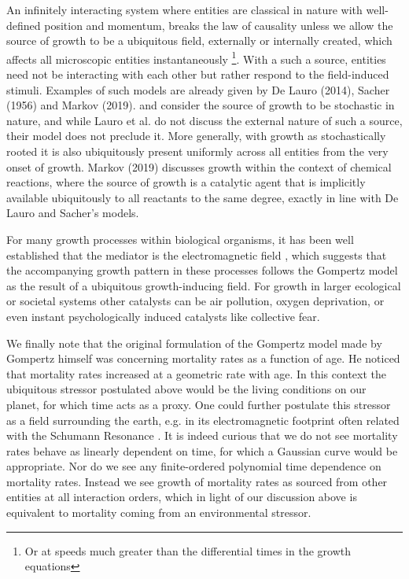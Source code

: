 \documentclass{article}
\begin{document}
An infinitely interacting system where entities are classical in nature with well-defined position and momentum, breaks the law of causality unless we allow the source of growth to be a ubiquitous field, externally or internally created, which affects all microscopic entities instantaneously \footnote{Or at speeds much greater than the differential times in the growth equations}. With a such a source, entities need not be interacting with each other but rather respond to the field-induced stimuli. Examples of such models are already given by De Lauro (2014), Sacher (1956) and Markov (2019). \citet{de2014stochastic} and \citet{sacher1956statistical} consider the source of growth to be stochastic in nature, and while Lauro et al. do not discuss the external nature of such a source, their model does not preclude it. More generally, with growth as stochastically rooted it is also ubiquitously present uniformly across all entities from the very onset of growth. Markov (2019)\cite{markov2019reaction} discusses growth within the context of chemical reactions, where the source of growth is a catalytic agent that is implicitly available ubiquitously to all reactants to the same degree, exactly in line with De Lauro and Sacher's models. 

For many growth processes within biological organisms, it has been well established that the mediator is the electromagnetic field \cite{becker1984electromagnetic}, which suggests that the accompanying growth pattern in these processes follows the Gompertz model as the result of a ubiquitous growth-inducing field. For growth in larger ecological or societal systems other catalysts can be air pollution, oxygen deprivation, or even instant psychologically induced catalysts like collective fear. 

We finally note that the original formulation of the Gompertz model made by Gompertz himself was concerning mortality rates as a function of age. He noticed that mortality rates increased at a geometric rate with age. In this context the ubiquitous stressor postulated above would be the living conditions on our planet, for which time acts as a proxy. One could further postulate this stressor as a field surrounding the earth, e.g. in its electromagnetic footprint often related with the Schumann Resonance \cite{cherry2002schumann,schumann1952strahlungslosen}. It is indeed curious that we do not see mortality rates behave as linearly dependent on time, for which a Gaussian curve would be appropriate. Nor do we see any finite-ordered polynomial time dependence on mortality rates. Instead we see growth of mortality rates as sourced from other entities at all interaction orders, which in light of our discussion above is equivalent to mortality coming from an environmental stressor.
\end{document}
